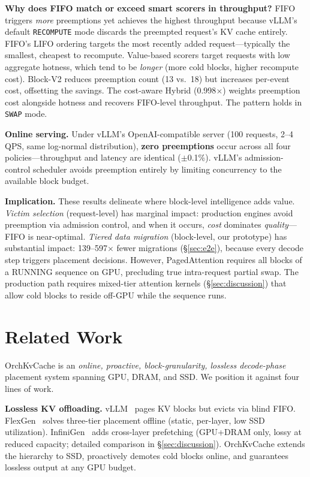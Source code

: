 \documentclass[conference]{IEEEtran}
\begin{document}
\textbf{Why does FIFO match or exceed smart scorers in throughput?} FIFO triggers \emph{more} preemptions yet achieves the highest throughput because vLLM's default \texttt{RECOMPUTE} mode discards the preempted request's KV cache entirely. FIFO's LIFO ordering targets the most recently added request---typically the smallest, cheapest to recompute. Value-based scorers target requests with low aggregate hotness, which tend to be \emph{longer} (more cold blocks, higher recompute cost). Block-V2 reduces preemption count (13 vs.\ 18) but increases per-event cost, offsetting the savings. The cost-aware Hybrid (0.998$\times$) weights preemption cost alongside hotness and recovers FIFO-level throughput. The pattern holds in \texttt{SWAP} mode.

\textbf{Online serving.} Under vLLM's OpenAI-compatible server (100 requests, 2--4 QPS, same log-normal distribution), \textbf{zero preemptions} occur across all four policies---throughput and latency are identical ($\pm$0.1\%). vLLM's admission-control scheduler avoids preemption entirely by limiting concurrency to the available block budget.

\textbf{Implication.} These results delineate where block-level intelligence adds value. \emph{Victim selection} (request-level) has marginal impact: production engines avoid preemption via admission control, and when it occurs, \emph{cost} dominates \emph{quality}---FIFO is near-optimal. \emph{Tiered data migration} (block-level, our prototype) has substantial impact: 139--597$\times$ fewer migrations (\S\ref{sec:e2e}), because every decode step triggers placement decisions. However, PagedAttention requires all blocks of a RUNNING sequence on GPU, precluding true intra-request partial swap. The production path requires mixed-tier attention kernels (\S\ref{sec:discussion}) that allow cold blocks to reside off-GPU while the sequence runs.

\section{Related Work}

OrchKvCache is an \emph{online, proactive, block-granularity, lossless decode-phase} placement system spanning GPU, DRAM, and SSD. We position it against four lines of work.

\textbf{Lossless KV offloading.}
vLLM~\cite{vllm} pages KV blocks but evicts via blind FIFO. FlexGen~\cite{flexgen} solves three-tier placement offline (static, per-layer, low SSD utilization). InfiniGen~\cite{infinigen} adds cross-layer prefetching (GPU+DRAM only, lossy at reduced capacity; detailed comparison in \S\ref{sec:discussion}). OrchKvCache extends the hierarchy to SSD, proactively demotes cold blocks online, and guarantees lossless output at any GPU budget.
\end{document}
